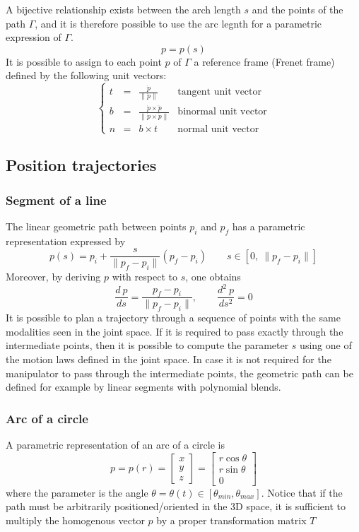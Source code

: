 \documentclass{book}
\begin{document}
A bijective relationship exists between the arch length $s$ and the points of the path $\Gamma$, and it is therefore possible to use the arc legnth for a parametric expression of $\Gamma$.
\[
    p=p(s)
\]
It is possible to assign to each point $p$ of $\Gamma$ a reference frame (Frenet frame) defined by the following unit vectors: 
\[
    \left\{\begin{array}{llll}
            t & = & \displaystyle\frac{\dot{p}}{\|\dot{p}\|} & \text{tangent unit vector}\\
            b & = & \displaystyle\frac{\dot{p}\times \ddot{p}}{\|\dot{p} \times \ddot{p}\|} & \text{binormal unit vector}\\
            n & = & b\times t & \text{normal unit vector}
    \end{array}\right.
\]
\subsection{Position trajectories}
\subsubsection{Segment of a line}
The linear geometric path between points $p_i$ and $p_f$ has a parametric representation expressed by 
\[
    p(s) = p_i + \displaystyle\frac{s}{\|p_f-p_i\|}(p_f-p_i) \qquad s \in [0,~\|p_f-p_i\|]
\]
Moreover, by deriving $p$ with respect to $s$, one obtains 
\[
    \displaystyle\frac{d~p}{ds}= \displaystyle\frac{p_f-p_i}{\|p_f-p_i\|}, \qquad \displaystyle\frac{d^2~p}{ds^2}=0
\]
It is possible to plan a trajectory through a sequence of points with the same modalities seen in the joint space. If it is required to pass exactly through the intermediate points, then it is possible to compute the parameter $s$ using one of the motion laws defined in the joint space. In case it is not required for the manipulator to pass through the intermediate points, the geometric path can be defined for example by linear segments with polynomial blends.
\subsubsection{Arc of a circle}
A parametric representation of an arc of a circle is 
\[
    p=p(r) = \begin{bmatrix}
        x \\ y \\ z
    \end{bmatrix} = \begin{bmatrix}
    r \cos{\theta} \\r \sin{\theta} \\ 0
    \end{bmatrix}
\]
where the parameter is the angle $\theta= \theta(t)\in[\theta_{min},\theta_{max}]$. Notice that if the path must be arbitrarily positioned/oriented in the 3D space, it is sufficient to multiply the homogenous vector $p$ by a proper transformation matrix $T$
\end{document}
